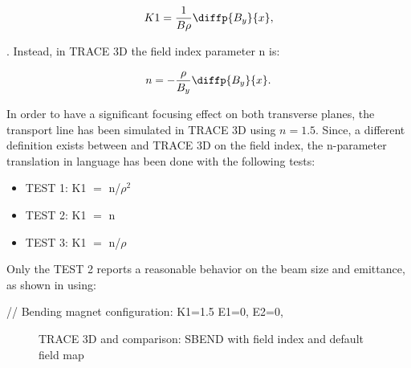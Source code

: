 \begin{itemize}
\begin{equation}
K1 = \frac{1}{B\rho}\diffp{B_y}{x},
\end{equation}

. Instead, in TRACE 3D the field index parameter n is:

\begin{equation}
n = -\frac{\rho}{B_y}\diffp{B_y}{x}.
\end{equation}

In order to have a significant focusing effect on both transverse planes, the transport line has been simulated in TRACE 3D using $n = 1.5$. Since, a different definition exists between \opal and TRACE 3D on the field index, the n-parameter translation in \opal language has been done with the following tests:

\begin{itemize}[noitemsep]
\item[] TEST 1: K1 $=$ n/$\rho^2$
\item[] TEST 2: K1 $=$ n
\item[] TEST 3: K1 $=$ n/$\rho$
\end{itemize}

Only the TEST 2 reports a reasonable behavior on the beam size and emittance, as shown in  using:

\begin{example}
// Bending magnet configuration:
K1=1.5
E1=0, E2=0,
\end{example}

\begin{figure}[!htb]
\begin{center}
    \hspace{1.8cm}
    \caption{TRACE 3D and \opal comparison: SBEND with field index and default field map}
    \label{fig:SBEND_FI}
\end{center}
 \end{figure}


\end{itemize}

